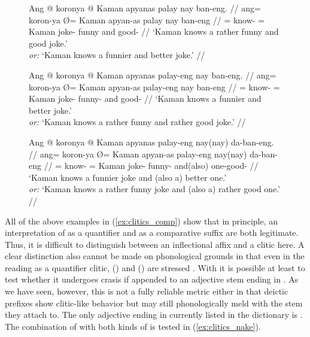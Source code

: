 \begin{figure}[h]
\pex\label{ex:clitics_comp}
\a\label{ex:clitics_comp1}\begingl
	\gla Ang @ koronya {} @ Kaman apyanas palay nay ban-eng. //
	\glb ang= koron-ya Ø= Kaman apyan-as palay nay ban-eng //
	\glc \AgtT{}= know-\TsgM{} \Top{}= Kaman joke-\Parg{} funny and
		good-\Comp{} //
	\glft `Kaman knows a rather funny and good joke.' \\
		\textit{or:} `Kaman knows a funnier and better joke.' //
\endgl

\a\label{ex:clitics_comp2}\begingl
	\gla Ang @ koronya {} @ Kaman apyanas palay-eng nay ban-eng. //
	\glb ang= koron-ya Ø= Kaman apyan-as palay-eng nay ban-eng //
	\glc \AgtT{}= know-\TsgM{} \Top{}= Kaman joke-\Parg{} funny-\Comp{} and
		good-\Comp{} //
	\glft `Kaman knows a funnier and better joke.' \\
		\textit{or:} `Kaman knows a rather funny and rather good joke.' //
\endgl

\a\label{ex:clitics_comp3}\begingl
	\gla Ang @ koronya {} @ Kaman apyanas palay-eng nay(nay) da-ban-eng. //
	\glb ang= koron-ya Ø= Kaman apyan-as palay-eng nay(nay) da-ban-eng //
	\glc \AgtT{}= know-\TsgM{} \Top{}= Kaman joke-\Parg{} funny-\Comp{}
		and(\til{}also) one-good-\Comp{} //
	\glft `Kaman knows a funnier joke and (also a) better one.' \\
		\textit{or:} `Kaman knows a rather funny joke and (also a) rather good 
		one.' //
\endgl
\xe
\end{figure}

All of the above examples in (\ref{ex:clitics_comp}) show that in
principle, an interpretation of  as a quantifier and
as a comparative suffix are both legitimate. Thus, it is difficult to
distinguish between an inflectional affix and a clitic here. A clear
distinction also cannot be made on phonological grounds in that even in the
reading as a quantifier clitic,  (\Comp{}) and
 (\Supl{}) are stressed 
\parencite[compare][90--92]{spencerluis2012}. With  it is
possible at least to test whether it undergoes crasis if appended to an
adjective stem ending in . As we have seen, however, this is not a
fully reliable metric either in that deictic prefixes show clitic-like behavior
but may still phonologically meld with the stem they attach to. The only
adjective ending in  currently listed in the dictionary is 
. The combination of  with both
kinds of  is tested in (\ref{ex:clitics_nake}).

